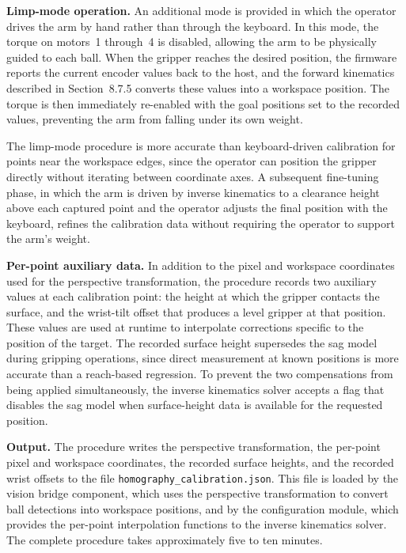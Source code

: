 \textbf{Limp-mode operation.} An additional mode is provided 
in which the operator drives the arm by hand rather than 
through the keyboard. In this mode, the torque on motors~1 
through~4 is disabled, allowing the arm to be physically 
guided to each ball. When the gripper reaches the desired 
position, the firmware reports the current encoder values back 
to the host, and the forward kinematics described in 
Section~8.7.5 converts these values into a workspace position. 
The torque is then immediately re-enabled with the goal 
positions set to the recorded values, preventing the arm from 
falling under its own weight.

The limp-mode procedure is more accurate than keyboard-driven 
calibration for points near the workspace edges, since the 
operator can position the gripper directly without iterating 
between coordinate axes. A subsequent fine-tuning phase, in 
which the arm is driven by inverse kinematics to a clearance 
height above each captured point and the operator adjusts the 
final position with the keyboard, refines the calibration data 
without requiring the operator to support the arm's weight.

\textbf{Per-point auxiliary data.} In addition to the pixel 
and workspace coordinates used for the perspective 
transformation, the procedure records two auxiliary values at 
each calibration point: the height at which the gripper 
contacts the surface, and the wrist-tilt offset that produces 
a level gripper at that position. These values are used at 
runtime to interpolate corrections specific to the position 
of the target. The recorded surface height supersedes the 
sag model during gripping operations, since direct 
measurement at known positions is more accurate than a 
reach-based regression. To prevent the two compensations from 
being applied simultaneously, the inverse kinematics solver 
accepts a flag that disables the sag model when surface-height 
data is available for the requested position.

\textbf{Output.} The procedure writes the perspective 
transformation, the per-point pixel and workspace 
coordinates, the recorded surface heights, and the recorded 
wrist offsets to the file 
\texttt{homography\_calibration.json}. This file is loaded by 
the vision bridge component, which uses the perspective 
transformation to convert ball detections into workspace 
positions, and by the configuration module, which provides 
the per-point interpolation functions to the inverse 
kinematics solver. The complete procedure takes approximately 
five to ten minutes.

